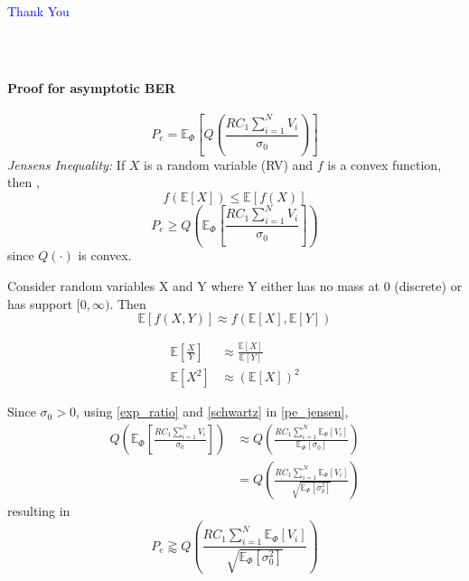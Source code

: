 \documentclass{beamer}
\providecommand{\sbrak}[1]{\ensuremath{{}\left[#1\right]}}
\providecommand{\brak}[1]{\ensuremath{\left(#1\right)}}
\theoremstyle{remark}
\begin{document}
\begin{frame}
\centering
\textcolor{blue}{ \LARGE {Thank You}}
\end{frame}

\begin{frame}
\frametitle{\,}
\framesubtitle{Proof for asymptotic BER}
\begin{equation}
\label{ber_cond_one}
P_e  = \mathbb{E}_{\Phi}\sbrak{\textit{Q}\brak{\frac{RC_1\sum_{i=1}^N V_i}{ \sigma_0}}}
\end{equation}
%
{\textit{Jensens Inequality:}}
If $X$ is a random variable (RV) and $f$ is a convex function, then , 
\begin{equation}
f\brak{\mathbb{E}\sbrak{X}} \leq \mathbb{E}\sbrak{f\brak{X}}
\label{jensen}
\end{equation}
%
%
\begin{equation}
\label{pe_jensen}
P_e  \geq \textit{Q}\brak{ \mathbb{E}_{\Phi}\sbrak{\frac{RC_1\sum_{i=1}^NV_i}{\sigma_0}}}
\end{equation}
%
since $Q\brak{\cdot}$ is convex.
%
\end{frame}
\begin{frame}

\begin{lemma}
Consider random variables X and Y where Y either has no mass at 0 (discrete) or has support
$[0,\infty )$. Then 
\begin{equation}
\mathbb{E}\sbrak{f\brak{X,Y}} \approx f\brak{\mathbb{E}\sbrak{X},\mathbb{E}\sbrak{Y}} 
\end{equation}
\end{lemma}
\begin{corollary}
\begin{align}
\label{exp_ratio}
\mathbb{E}\sbrak{\frac{X}{Y}} &\approx \frac{\mathbb{E}\sbrak{X}}{\mathbb{E}\sbrak{Y}}
\\
\mathbb{E}\sbrak{X^2} &\approx  \brak{\mathbb{E}\sbrak{X}}^2
\label{schwartz}
\end{align}
\end{corollary}

\end{frame}
\begin{frame}
%
Since $\sigma_0 > 0$, using \eqref{exp_ratio} and \eqref{schwartz} in \eqref{pe_jensen},
%
\begin{align}
\textit{Q}\brak{ \mathbb{E}_{\Phi}\sbrak{\frac{RC_1\sum_{i=1}^NV_i}{\sigma_0}}} &\approx \textit{Q}\brak{\frac{RC_1\sum_{i=1}^N \mathbb{E}_{\Phi}\sbrak {V_i}}{ \mathbb{E}_{\Phi}\sbrak{\sigma_0}}}
\nonumber \\
&= \textit{Q}\brak{\frac{RC_1\sum_{i=1}^N \mathbb{E}_{\Phi}\sbrak {V_i}}{ \sqrt{\mathbb{E}_{\Phi}\sbrak{\sigma_0^2}}}}
\end{align}
resulting in
\begin{equation}
P_e \gtrapprox \textit{Q}\brak{\frac{RC_1\sum_{i=1}^N \mathbb{E}_{\Phi}\sbrak {V_i}}{ \sqrt{\mathbb{E}_{\Phi}\sbrak{\sigma_0^2}}}}
\end{equation}
%
%
\end{frame}
\end{document}
